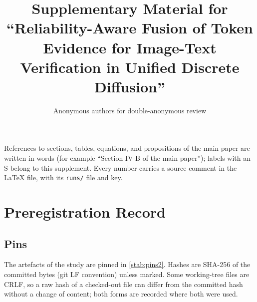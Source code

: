 \documentclass[journal,onecolumn]{IEEEtran}
\theoremstyle{plain}
\begin{document}
\title{Supplementary Material for ``Reliability-Aware Fusion of Token Evidence for Image-Text Verification in Unified Discrete Diffusion''}
\author{Anonymous authors for double-anonymous review}
\maketitle

\noindent References to sections, tables, equations, and propositions of the main paper are written in words (for example ``Section
IV-B of the main paper''); labels with an S belong to this supplement.
Every number carries a source comment in the LaTeX file, with its \texttt{runs/} file and key.

\section{Preregistration Record}\label{sup:prereg}

\subsection{Pins}
The artefacts of the study are pinned in \cref{stab:pins2}.
Hashes are SHA-256 of the committed bytes (git LF convention) unless marked.
Some working-tree files are CRLF, so a raw hash of a checked-out file can differ from the committed hash without a change of content;
both forms are recorded where both were used.
\end{document}
